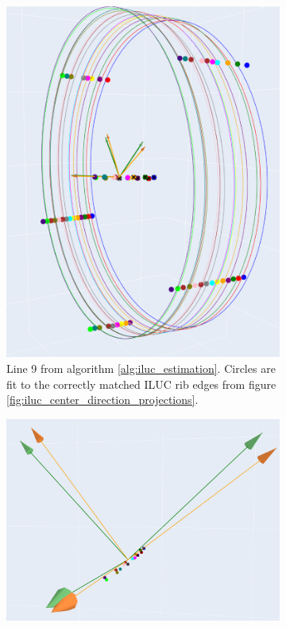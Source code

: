 \begin{figure}[H]
\begin{subfigure}[c]{0.45\textwidth}
        \includegraphics[width=\textwidth]{images/ILUC_matched_edges.png}
        \caption{Line 9 from algorithm \ref{alg:iluc_estimation}. Circles are fit to the correctly matched ILUC rib edges from figure \ref{fig:iluc_center_direction_projections}.}
        \label{fig:iluc_matched_edges}
    \end{subfigure}
    \begin{subfigure}[c]{0.45\textwidth}
        \includegraphics[width=\textwidth]{images/ILUC_corrected_direction.png}

\end{subfigure}
\end{figure}
